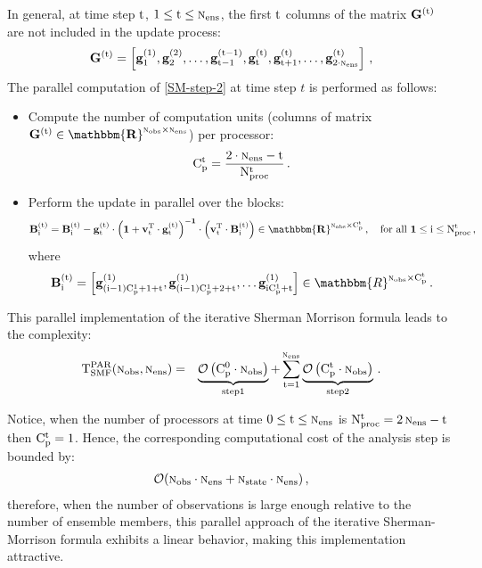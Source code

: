 \documentclass[12pt]{article}
\newcommand{\Nobs}{\textsc{n}_{{\rm obs}}}
\newcommand{\Nens}{\textsc{n}_{{\rm ens}}}
\newcommand{\Nproc}[1]{{\rm N_{proc}^{\rm #1}}}
\newcommand{\nc}[1]{{\rm C_{p}^{\rm #1}}}
\newcommand{\Nstate}{\textsc{n}_{{\rm state}}}
\newcommand{\BO}{{\mathcal O}}
\renewcommand{\v}[1]{{\bf v}_{{\rm #1}}}
\renewcommand{\Re}{\mathbbm{R}}
\newcommand{\G}[1]{\bf G^{(\rm #1)}}
\newcommand{\gj}[2]{\bf {g_{\rm #1}^{(\rm #2)}}}
\newcommand{\Bi}[2]{{\bf B_{\rm #1}^{\rm ( #2 )}}}
\begin{document}
In general, at time step $\rm t$, $1 \le \rm t \le \Nens$, the first $\rm t$ columns of the matrix $\G{t}$ are not included in the update process:
\begin{eqnarray} \nonumber
\displaystyle 
\G{t} = \left[ \gj{1}{1}, \gj{2}{2}, \ldots, \gj{t-1}{t-1}, \gj{t}{t}, \gj{t+1}{t}, \ldots, \gj{2 \cdot \Nens}{t}\right ]\, ,
\end{eqnarray}
The parallel computation of \eqref{SM-step-2} at time step $t$ is performed as follows:
\begin{itemize}
\item Compute the number of computation units (columns of matrix $\G{t} \in \Re^{\Nobs \times \Nens}$) per processor:
\begin{eqnarray} \nonumber
\displaystyle \nc{t} = \frac{2 \cdot \Nens - {\rm t}}{\Nproc{t}}\,.
\end{eqnarray}
\item Perform the update in parallel over the blocks:
\begin{eqnarray} \nonumber
\displaystyle 
\Bi{i}{t} = \Bi{i}{t}-\gj{t}{t} \cdot \left (1+\v{t}^{\rm T} \cdot \gj{t}{t} \right )^{-1} \cdot \left( \v{t}^{\rm T} \cdot \Bi{i}{t} \right ) \in \Re^{\Nobs \times \nc{t}}\,,\quad
\mbox{for all } 1 \le {\rm i} \le \Nproc{t}\,,
\end{eqnarray}
where 
\begin{eqnarray} \nonumber
\displaystyle 
\Bi{i}{t} = \left[ \gj{(i-1)\nc{1}+1+t}{1}, \gj{(i-1)\nc{1}+2+t}{1}, \ldots \gj{i\nc{1}+t}{1} \right ] \in \Re^{\Nobs \times \nc{t}}\,.
\end{eqnarray}
\end{itemize}

This parallel implementation of the iterative Sherman Morrison formula leads to the complexity:
\begin{eqnarray} \nonumber
\displaystyle \rm T_{\rm SMF}^{\rm PAR}(\Nobs,\Nens) &=& \underbrace{\BO \left( \nc{0} \cdot \Nobs \right )}_{\rm step 1} + \sum_{\rm t = 1}^{\Nens}\underbrace{\BO \left( \nc{t} \cdot \Nobs \right )}_{\rm step 2}\, .
\end{eqnarray}

Notice, when the number of processors at time $0 \le \rm t \le \Nens$ is $\Nproc{t} = 2 \, \Nens - \rm t$ then $\nc{t} = 1$. Hence, the corresponding computational cost of the analysis step is bounded by:
\begin{eqnarray} \nonumber
\displaystyle  \BO(\Nobs \cdot \Nens + \Nstate \cdot \Nens) \,,
\end{eqnarray}
therefore, when the number of observations is large enough relative to the number of ensemble members, this parallel approach of the iterative Sherman-Morrison formula exhibits a linear behavior, making this implementation attractive. 
\end{document}
